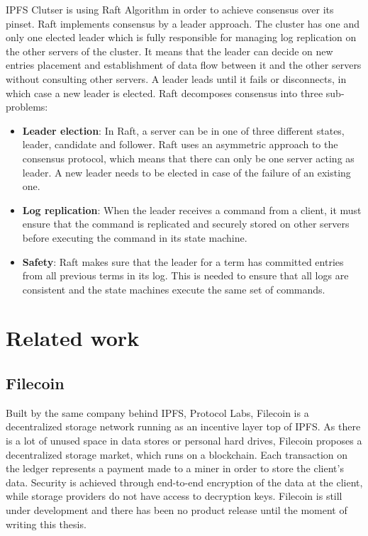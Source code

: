 \documentclass[12pt]{report}
\begin{document}
IPFS Clutser is using Raft Algorithm \cite{raft} in order to achieve consensus over its pinset. Raft implements consensus by a leader approach. The cluster has one and only one elected leader which is fully responsible for managing log replication on the other servers of the cluster. It means that the leader can decide on new entries placement and establishment of data flow between it and the other servers without consulting other servers. A leader leads until it fails or disconnects, in which case a new leader is elected. Raft decomposes consensus into three sub-problems:
\begin{itemize}
\item \textbf{Leader election}: In Raft, a server can be in one of three different states, leader, candidate and follower. Raft uses an asymmetric approach to the consensus protocol, which means that there can only be one server acting as leader. A new leader needs to be elected in case of the failure of an existing one. 
\item \textbf{Log replication}: When the leader receives a command from a client, it must ensure that the command is replicated and securely stored on other servers before executing the command in its state machine.
\item \textbf{Safety}: Raft makes sure that the leader for a term has committed entries from all previous terms in its log. This is needed to ensure that all logs are consistent and the state machines execute the same set of commands.
\end{itemize}

\section{Related work}

\subsection{Filecoin}

Built by the same company behind IPFS, Protocol Labs, Filecoin \cite{filecoin} is a decentralized storage network running as an incentive layer top of IPFS. As there is a lot of unused space in data stores or personal hard drives, Filecoin proposes a decentralized storage market, which runs on a blockchain. Each transaction on the ledger represents a payment made to a miner in order to store the client's data. Security is achieved through end-to-end encryption of the data at the client,  while storage providers do not have access to decryption keys. Filecoin is still under development and there has been no product release until the moment of writing this thesis.
\end{document}
